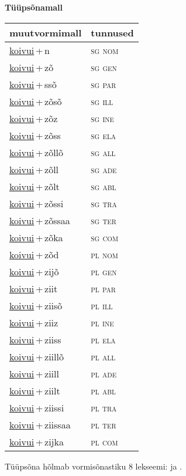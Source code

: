 
\vspace{1.8em}
\begin{minipage}{\textwidth}
\textbf{Tüüpsõnamall \,}\\

\begin{sideways}
\begin{tabular}{l l}
muutvormimall & tunnused \\
\hline
\underline{koivui}\,+\,n & \textsc{ sg nom } \\
\underline{koivui}\,+\,zõ & \textsc{ sg gen } \\
\underline{koivui}\,+\,ssõ & \textsc{ sg par } \\
\underline{koivui}\,+\,zõsõ & \textsc{ sg ill } \\
\underline{koivui}\,+\,zõz & \textsc{ sg ine } \\
\underline{koivui}\,+\,zõss & \textsc{ sg ela } \\
\underline{koivui}\,+\,zõllõ & \textsc{ sg all } \\
\underline{koivui}\,+\,zõll & \textsc{ sg ade } \\
\underline{koivui}\,+\,zõlt & \textsc{ sg abl } \\
\underline{koivui}\,+\,zõssi & \textsc{ sg tra } \\
\underline{koivui}\,+\,zõssaa & \textsc{ sg ter } \\
\underline{koivui}\,+\,zõka & \textsc{ sg com } \\
\underline{koivui}\,+\,zõd & \textsc{ pl nom } \\
\underline{koivui}\,+\,zijõ & \textsc{ pl gen } \\
\underline{koivui}\,+\,ziit & \textsc{ pl par } \\
\underline{koivui}\,+\,ziisõ & \textsc{ pl ill } \\
\underline{koivui}\,+\,ziiz & \textsc{ pl ine } \\
\underline{koivui}\,+\,ziiss & \textsc{ pl ela } \\
\underline{koivui}\,+\,ziillõ & \textsc{ pl all } \\
\underline{koivui}\,+\,ziill & \textsc{ pl ade } \\
\underline{koivui}\,+\,ziilt & \textsc{ pl abl } \\
\underline{koivui}\,+\,ziissi & \textsc{ pl tra } \\
\underline{koivui}\,+\,ziissaa & \textsc{ pl ter } \\
\underline{koivui}\,+\,zijka & \textsc{ pl com } \\
\end{tabular}
\end{sideways}
\label{tab:tüüpsõnamall-koivuin}

\end{minipage}

 
\vspace{1em}
\noindent Tüüpsõna hõlmab vormisõnastiku 8 lekseemi:  ja .

